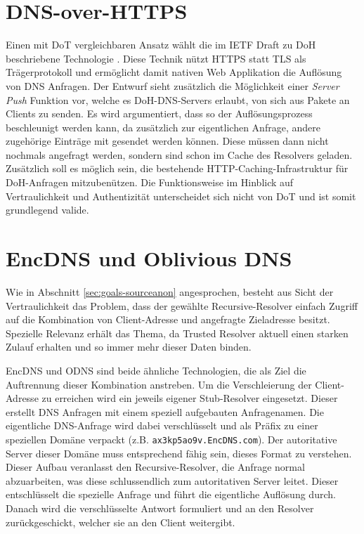\section{DNS-over-HTTPS}
Einen mit DoT vergleichbaren Ansatz wählt die im IETF Draft zu \ac{DoH} beschriebene Technologie \cite{Mcmanus2018}. Diese Technik nützt HTTPS statt TLS als Trägerprotokoll und ermöglicht damit nativen Web Applikation die Auflösung von DNS Anfragen. Der Entwurf sieht zusätzlich die Möglichkeit einer \textit{Server Push} Funktion vor, welche es \ac{DoH}-DNS-Servers erlaubt, von sich aus Pakete an Clients zu senden. Es wird argumentiert, dass so der Auflösungsprozess beschleunigt werden kann, da zusätzlich zur eigentlichen Anfrage, andere zugehörige Einträge mit gesendet werden können. Diese müssen dann nicht nochmals angefragt werden, sondern sind schon im Cache des Resolvers geladen. Zusätzlich soll es möglich sein, die bestehende HTTP-Caching-Infrastruktur für DoH-Anfragen mitzubenützen. Die Funktionsweise im Hinblick auf Vertraulichkeit und Authentizität unterscheidet sich nicht von DoT und ist somit grundlegend valide. 

\section{EncDNS und Oblivious DNS}
\label{tec:encdns-odns}
Wie in Abschnitt \ref{sec:goals-sourceanon} angesprochen, besteht aus Sicht der Vertraulichkeit das Problem, dass der gewählte Recursive-Resolver einfach Zugriff auf die Kombination von Client-Adresse und angefragte Zieladresse besitzt. Spezielle Relevanz erhält das Thema, da Trusted Resolver aktuell einen starken Zulauf erhalten und so immer mehr dieser Daten binden.

EncDNS\cite{Herrmann2014} und \ac{ODNS}\cite{Schmitt2018} sind beide ähnliche Technologien, die als Ziel die Auftrennung dieser Kombination anstreben. Um die Verschleierung der Client-Adresse zu erreichen wird ein jeweils eigener Stub-Resolver eingesetzt. Dieser erstellt DNS Anfragen mit einem speziell aufgebauten Anfragenamen. Die eigentliche DNS-Anfrage wird dabei verschlüsselt und als Präfix zu einer speziellen Domäne verpackt (z.B. \texttt{ax3kp5ao9v.EncDNS.com}). Der autoritative Server dieser Domäne muss entsprechend fähig sein, dieses Format zu verstehen. Dieser Aufbau veranlasst den Recursive-Resolver, die Anfrage normal abzuarbeiten, was diese schlussendlich zum autoritativen Server leitet. Dieser entschlüsselt die spezielle Anfrage und führt die eigentliche Auflösung durch. Danach wird die verschlüsselte Antwort formuliert und an den Resolver zurückgeschickt, welcher sie an den Client weitergibt.


